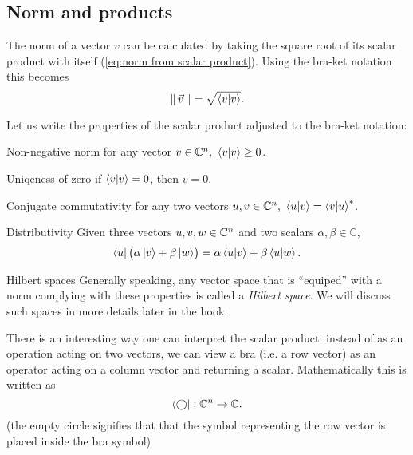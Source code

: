 \subsection{Norm and products}
The norm of a vector $v$ can be calculated by taking the square root of its scalar product with itself (\autoref{eq:norm from scalar product}). Using the bra-ket notation this becomes
\begin{equation}
	\norm{v} = \sqrt{\innerproduct{v}}.
	\label{eq:norm_braket}
\end{equation}

Let us write the properties of the scalar product adjusted to the bra-ket notation:
\begin{descitemize}
	\item[Non-negative norm] for any vector $v\in\Cs{n},\ \innerproduct{v}\geq0$.
	\item[Uniqeness of zero] if $\innerproduct{v}=0$, then $v=0$.
	\item[Conjugate commutativity] for any two vectors $u,v\in\Cs{n},\ \innerproduct{u}{v}=\sconj{\innerproduct{v}{u}}$.
	\item[Distributivity] Given three vectors $u,v,w\in\mathbb{C}^{n}$ and two scalars $\alpha,\beta\in\mathbb{C}$,
		\[
			\bra{u} \left( \alpha\ket{v}+\beta\ket{w} \right) = \alpha\innerproduct{u}{v} + \beta\innerproduct{u}{w}.
		\]
\end{descitemize}

\begin{note}{Hilbert spaces}
Generally speaking, any vector space that is ``equiped'' with a norm complying with these properties is called a \emph{Hilbert space}. We will discuss such spaces in more details later in the book.
\end{note}

There is an interesting way one can interpret the scalar product: instead of as an operation acting on two vectors, we can view a bra (i.e. a row vector) as an operator acting on a column vector and returning a scalar. Mathematically this is written as
\begin{equation}
	\bra{\bigcirc}: \mathbb{C}^{n}\to\mathbb{C}.
	\label{eq:bra_as_operator}
\end{equation}
(the empty circle signifies that that the symbol representing the row vector is placed inside the bra symbol)


